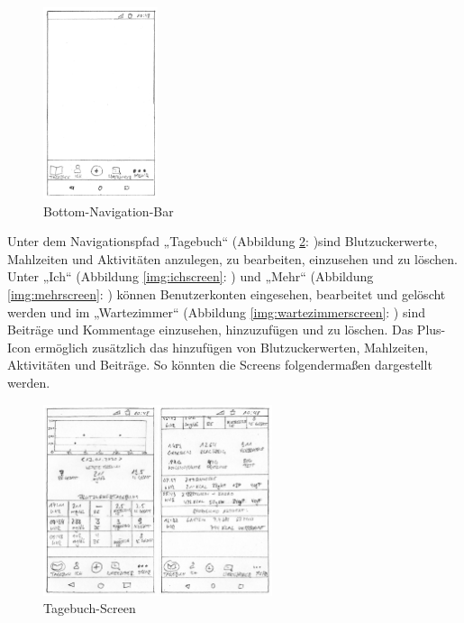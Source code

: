\begin{figure}[H]
	\centering
	\includegraphics[width=0.3\textwidth]{images/navigationbar.png}
	\captionsetup{justification=centering}
	\caption{Bottom-Navigation-Bar}
	\label{img:navigationbar}
\end{figure}
Unter dem Navigationspfad „Tagebuch“ (Abbildung \ref{img:tagebuchscreen}: )sind Blutzuckerwerte, Mahlzeiten und Aktivitäten anzulegen, zu bearbeiten, einzusehen und zu löschen. Unter „Ich“ (Abbildung \ref{img:ichscreen}: ) und „Mehr“ (Abbildung \ref{img:mehrscreen}: ) können Benutzerkonten eingesehen, bearbeitet und gelöscht werden und im „Wartezimmer“ (Abbildung \ref{img:wartezimmerscreen}: ) sind Beiträge und Kommentage einzusehen, hinzuzufügen und zu löschen. Das Plus-Icon ermöglich zusätzlich das hinzufügen von Blutzuckerwerten, Mahlzeiten, Aktivitäten und Beiträge. So könnten die Screens folgendermaßen dargestellt werden. 
\begin{figure}[H]
	\centering
	\includegraphics[width=0.6\textwidth]{images/tagebuchscreen.png}
	\captionsetup{justification=centering}
	\caption{Tagebuch-Screen}
	\label{img:tagebuchscreen}
\end{figure}
